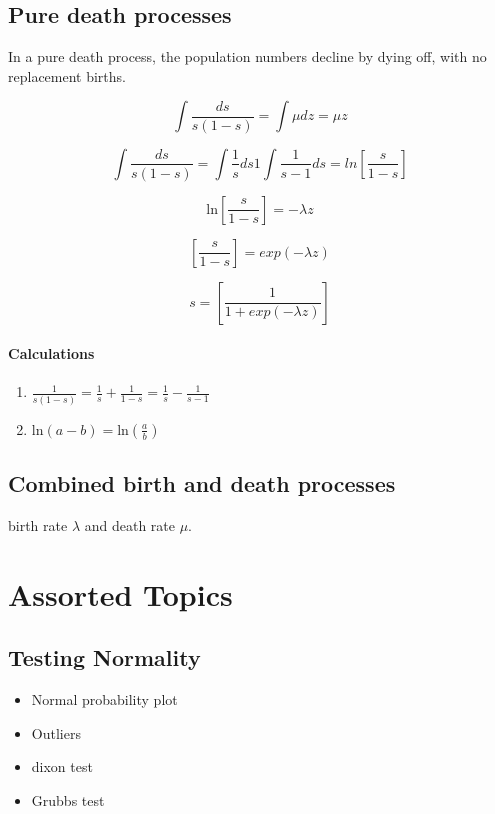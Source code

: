 \section{Pure death processes}
In a pure death process, the population numbers decline by dying
off, with no replacement births.

\[ \int \frac{ds}{s(1-s)} = \int \mu dz = \mu z \]


\[ \int \frac{ds}{s(1-s)} = \int \frac{1}{s} ds 1 \int
\frac{1}{s-1}ds= ln \left[\frac{s}{1-s} \right]
\]

\[  \mbox{ln} \left[\frac{s}{1-s} \right] = -\lambda z
\]

\[  \left[\frac{s}{1-s} \right] = exp(-\lambda z)
\]

\[  s = \left[\frac{1}{1+exp(-\lambda z)} \right]
\]

\subsubsection{Calculations}
\begin{enumerate} \item  $ \frac{1}{s(1-s)} = \frac{1}{s} + \frac{1}{1-s} =
	\frac{1}{s} - \frac{1}{s-1}$
	\item $ \mbox{ln}(a-b) = \mbox{ln}(\frac{a}{b})$\\
\end{enumerate}

\section{Combined birth and death processes}
birth rate $\lambda$ and death rate $\mu$.


\newpage
\chapter{Assorted Topics}

\section{Testing Normality}

\begin{itemize}
	\item Normal probability plot \item Outliers \item dixon test
	\item Grubbs test
\end{itemize}


